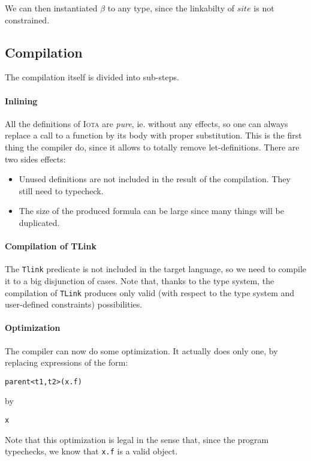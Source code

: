 \documentclass[10pt,a4paper]{article}
\newcommand\Iota{\textsc{Iota}}
\newcommand{\ocaml}{\texttt}
\begin{document}
We can then instantiated $\beta$ to any type, since the linkabilty of $site$ is not constrained.

\subsection{Compilation}
The compilation itself is divided into sub-steps.

\paragraph{Inlining}
All the definitions of \Iota{} are \emph{pure}, ie. without any effects, so one can always replace a call to a function by its body with proper substitution. This is the first thing the compiler do, since it allows to totally remove let-definitions. There are two sides effects:

\begin{itemize}
\item Unused definitions are not included in the result of the compilation. They still need to typecheck.
\item The size of the produced formula can be large since many things will be duplicated.
\end{itemize}

\paragraph{Compilation of TLink}
\label{para:tlink}
The \ocaml{Tlink} predicate is not included in the target language, so we need to compile it to a big disjunction of cases. Note that, thanks to the type system, the compilation of \ocaml{TLink} produces only valid (with respect to the type system and user-defined constraints) possibilities.

\paragraph{Optimization}
The compiler can now do some optimization. It actually does only one, by replacing expressions of the form:
\begin{verbatim}
parent<t1,t2>(x.f)
\end{verbatim}
by
\begin{verbatim}
x
\end{verbatim}
Note that this optimization is legal in the sense that, since the program typechecks, we know that \ocaml{x.f} is a valid object.
\end{document}

